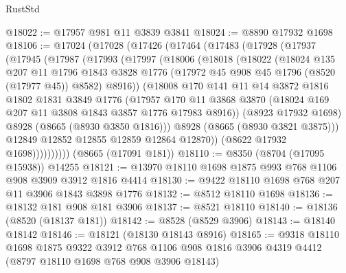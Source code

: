 \begin{lexlean}{RustStd}
\begin{coremodule}
@18022 := @17957 @981 @11 @3839 @3841
@18024 := @8890 @17932 @1698
@18106 := @17024
    (@17028
      (@17426
        (@17464
          (@17483
            (@17928
              (@17937
                (@17945
                  (@17987
                    (@17993
                      (@17997
                        (@18006
                          (@18018
                            (@18022
                              (@18024
                                @135
                                @207
                                @11
                                @1796
                                @1843
                                @3828
                                @1776
                                (@17972 @45 @908 @45 @1796 (@8520 (@17977 @45)) @8582)
                                @8916))
                            (@18008
                              @170
                              @141
                              @11
                              @14
                              @3872
                              @1816
                              @1802
                              @1831
                              @3849
                              @1776
                              (@17957
                                @170
                                @11
                                @3868
                                @3870
                                (@18024 @169 @207 @11 @3808 @1843 @3857 @1776 @17983 @8916))
                              (@8923 @17932 @1698)
                              @8928
                              (@8665 (@8930 @3850 @1816)))
                            @8928
                            (@8665 (@8930 @3821 @3875)))
                          @12849
                          @12852
                          @12855
                          @12859
                          @12864
                          @12870))
                      (@8622 @17932 @1698))))))))))
    (@8665 (@17091 @181))
@18110 := @8350 (@8704 (@17095 @15938)) @14255
@18121 := @13970 @18110 @1698 @1875 @993 @768 @1106 @908 @3909 @3912 @1816 @4414
@18130 := @9422 @18110 @1698 @768 @207 @11 @3906 @1843 @3898 @1776
@18132 := @8512 @18110 @1698
@18136 := @18132 @181 @908 @181 @3906
@18137 := @8521 @18110
@18140 := @18136 (@8520 (@18137 @181))
@18142 := @8528 (@8529 @3906)
@18143 := @18140 @18142
@18146 := @18121 (@18130 @18143 @8916)
@18165 := @9318
    @18110
    @1698
    @1875
    @9322
    @3912
    @768
    @1106
    @908
    @1816
    @3906
    @4319
    @4412
    (@8797 @18110 @1698 @768 @908 @3906 @18143)

\end{coremodule}
\end{lexlean}
